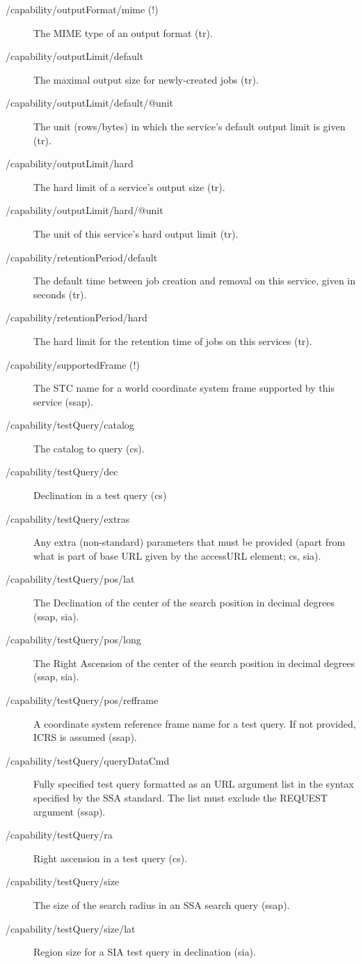 \documentclass[11pt,a4paper]{ivoa}
\begin{document}
\begin{description}
\item[/capability/outputFormat/mime (!)]The MIME type of an output format (tr).
\item[/capability/outputLimit/default]The maximal output size for newly-created jobs (tr).
\item[/capability/outputLimit/default/@unit]The unit (rows/bytes) in which the service's default output limit is given (tr).
\item[/capability/outputLimit/hard]The hard limit of a service's output size (tr).
\item[/capability/outputLimit/hard/@unit]The unit of this service's hard output limit (tr).
\item[/capability/retentionPeriod/default]The default time between job creation and removal on this service, given in seconds (tr).
\item[/capability/retentionPeriod/hard]The hard limit for the retention time of jobs on this services (tr).
\item[/capability/supportedFrame (!)]The STC name for a world coordinate system frame supported by this service (ssap).
\item[/capability/testQuery/catalog]The catalog to query (cs).
\item[/capability/testQuery/dec]Declination in a test query (cs)
\item[/capability/testQuery/extras]Any extra (non-standard) parameters that must be provided (apart from what is part of base URL given by the accessURL element; cs, sia).
\item[/capability/testQuery/pos/lat]The Declination of the center of the search position in decimal degrees (ssap, sia).
\item[/capability/testQuery/pos/long]The Right Ascension of the center of the search position in decimal degrees (ssap, sia).
\item[/capability/testQuery/pos/refframe]A coordinate system reference frame name for a test query. If not provided, ICRS is assumed (ssap).
\item[/capability/testQuery/queryDataCmd]Fully specified test query formatted as an URL argument list in the syntax specified by the SSA standard. The list must exclude the REQUEST argument (ssap).
\item[/capability/testQuery/ra]Right ascension in a test query (cs).
\item[/capability/testQuery/size]The size of the search radius in an SSA search query (ssap).
\item[/capability/testQuery/size/lat]Region size for a SIA test query in declination (sia).

\end{description}
\end{document}
